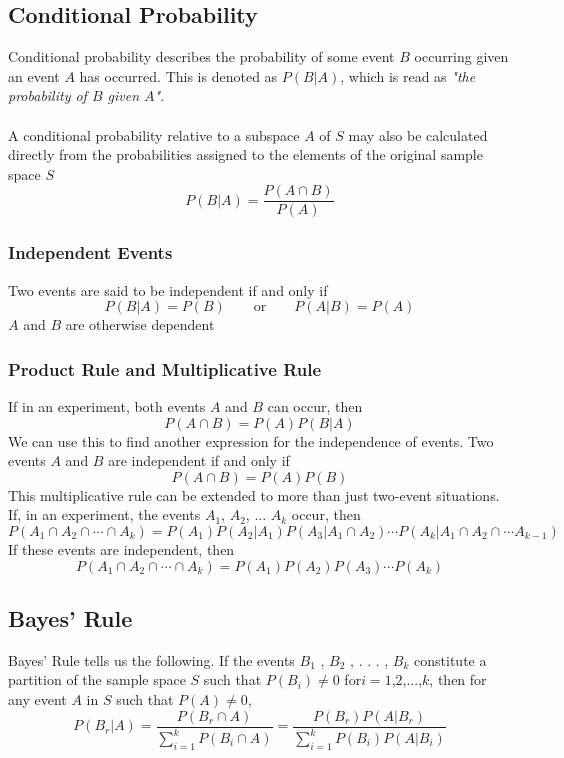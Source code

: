 \documentclass[11pt]{article}
\begin{document}
\subsection{Conditional Probability}
Conditional probability describes the probability of some event $B$ occurring given an event $A$ has occurred. This is denoted as $P(B|A)$, which is read as \textit{"the probability of $B$ given $A$"}. \\ \\ A conditional probability relative to a subspace $A$ of $S$ may also be calculated directly from the probabilities assigned to the elements of the original sample space $S$
$$ P(B|A) = \frac{P(A \cap B)}{P(A)}$$

\subsubsection{Independent Events}
Two events are said to be independent if and only if 
$$P(B|A) = P(B) \quad \quad \text{or} \quad  \quad P(A|B) = P(A)$$
$A$ and $B$ are otherwise dependent

\subsubsection{Product Rule and Multiplicative Rule}
If in an experiment, both events $A$ and $B$ can occur, then 
$$ P(A \cap B) = P(A)P(B|A)$$
We can use this to find another expression for the independence of events. Two events $A$ and $B$ are independent if and only if 
$$ P(A \cap B) = P(A)P(B)$$
This multiplicative rule can be extended to more than just two-event situations. If, in an experiment, the events $A_1$, $A_2$, ... $A_k$ occur, then
$$ P(A_1 \cap A_2 \cap \cdots \cap A_k) = P(A_1)P(A_2|A_1)P(A_3|A_1 \cap A_2) \cdots P(A_k| A_1 \cap A_2 \cap \cdots A_{k-1})$$ If these events are independent, then 
$$ P(A_1 \cap A_2 \cap \cdots \cap A_k) = P(A_1)P(A_2)P(A_3) \cdots P(A_k)$$

\subsection{Bayes' Rule}
Bayes' Rule tells us the following. If the events $B_1$ , $B_2$ , . . . , $B_k$ constitute a partition of the sample space $S$ such that $P(B_i) \neq 0$ for$ i = 1$,$2$,$...$,$k$, then for any event $A$ in $S$ such that $P(A) \neq 0$,
$$ P(B_r | A) = \frac{P(B_r \cap A)}{\sum_{i=1}^{k} P(B_i \cap A) } = \frac{P(B_r) P(A | B_r)}{\sum_{i=1}^{k} P(B_i)P(A|B_i) }$$
\end{document}

